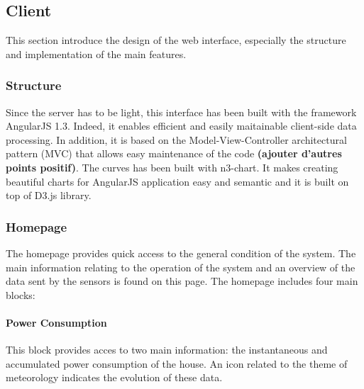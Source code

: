 \subsection{Client} %

This section introduce the design of the web interface, especially the structure and implementation of the main features.

\subsubsection{Structure}
    Since the server has to be light, this interface has been built with the framework AngularJS 1.3. Indeed, it enables efficient and easily maitainable client-side data processing. In addition, it is based on the Model-View-Controller architectural pattern (MVC) that allows easy maintenance of the code \textbf{(ajouter d'autres points positif)}. The curves has been built with n3-chart. It makes creating beautiful charts for AngularJS application easy and semantic and it is built on top of D3.js library.
     
\subsubsection{Homepage}

The homepage provides quick access to the general condition of the system.
The main information relating to the operation of the system and an overview of the data sent by the sensors is found on this page.
The homepage includes four main blocks:%
    \paragraph{Power Consumption} 
    This block provides acces to two main information: the instantaneous and accumulated power consumption of the house. An icon related to the theme of meteorology indicates the evolution of these data. %

